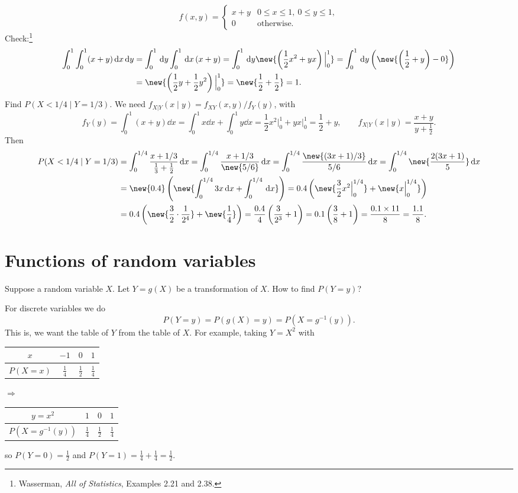 \begin{example}
\[
f(x,y) =
\begin{cases}
x + y & 0 \le x \le 1,\ 0 \le y \le 1,\\
0 & \text{otherwise}.
\end{cases}
\]
Check:\footnote{Wasserman, \emph{All of Statistics}, Examples 2.21 and 2.38.}
\begin{align*}
\int_0^1\int_0^1 (x+y)\dd x\dd y &= \int_0^1\dd y\int_0^1\dd x\,(x+y)
= \int_0^1\dd y\new{\left(\frac12 x^2 + yx\right)\Big|_0^1}
= \int_0^1\dd y\left(\new{\left(\frac12 + y\right) - 0}\right)\\
&= \new{\left(\frac12 y + \frac12 y^2\right)\Big|_0^1} = \new{\frac12 + \frac12} = 1.
\end{align*}
Find $P(X < 1/4 \mid Y = 1/3)$. We need $f_{X|Y}(x \mid y) = f_{XY}(x,y)/f_Y(y)$, with
\[
f_Y(y) = \int_0^1 (x+y)\dd x = \int_0^1 x\dd x + \int_0^1 y\dd x = \frac12 x^2\Big|_0^1 + yx\Big|_0^1 = \frac12 + y,
\qquad
f_{X|Y}(x \mid y) = \frac{x+y}{y + \frac12}.
\]
Then
\begin{align*}
P(X < 1/4 \mid Y = 1/3) &= \int_0^{1/4}\frac{x + 1/3}{\frac13 + \frac12}\dd x
= \int_0^{1/4}\frac{x + 1/3}{\new{5/6}}\dd x
= \int_0^{1/4}\frac{\new{(3x+1)/3}}{5/6}\dd x
= \int_0^{1/4}\new{\frac{2(3x+1)}{5}}\dd x\\
&= \new{0.4}\left(\new{\int_0^{1/4}3x\dd x + \int_0^{1/4}\dd x}\right)
= 0.4\left(\new{\frac32 x^2\Big|_0^{1/4}} + \new{x\Big|_0^{1/4}}\right)\\
&= 0.4\left(\new{\frac32\cdot\frac{1}{2^4}} + \new{\frac14}\right)
= \frac{0.4}{4}\left(\frac{3}{2^3} + 1\right) = 0.1\left(\frac38 + 1\right) = \frac{0.1\times 11}{8} = \frac{1.1}{8}.
\end{align*}
\end{example}

\section{Functions of random variables}
Suppose a random variable $X$. Let $Y = g(X)$ be a transformation of $X$. How to find $P(Y = y)$?

For discrete variables we do
\[
P(Y = y) = P(g(X) = y) = P(X = g^{-1}(y)).
\]
This is, we want the table of $Y$ from the table of $X$. For example, taking $Y = X^2$ with
\begin{center}
\begin{tabular}{c|ccc}
$x$ & $-1$ & $0$ & $1$\\ \hline
$P(X=x)$ & $\frac14$ & $\frac12$ & $\frac14$
\end{tabular}
\quad$\Rightarrow$\quad
\begin{tabular}{c|ccc}
$y = x^2$ & $1$ & $0$ & $1$\\ \hline
$P(X = g^{-1}(y))$ & $\frac14$ & $\frac12$ & $\frac14$
\end{tabular}
\end{center}
so $P(Y = 0) = \frac12$ and $P(Y = 1) = \frac14 + \frac14 = \frac12$.

